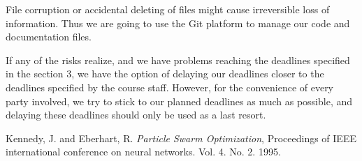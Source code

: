 \documentclass[twoside]{article}
\begin{document}
\begin{multicols}{2}
File corruption or accidental deleting of files might cause irreversible loss of information. Thus we are going to use the Git platform to manage our code and documentation files.

If any of the risks realize, and we have problems reaching the deadlines specified in the section 3, we have the option of delaying our deadlines closer to the deadlines specified by the course staff. However, for the convenience of every party involved, we try to stick to our planned deadlines as much as possible, and delaying these deadlines should only be used as a last resort.

\begin{thebibliography}{99} %

 Kennedy, J. and Eberhart, R.
  \emph{Particle Swarm Optimization},
 Proceedings of IEEE international conference on neural networks. Vol. 4. No. 2. 1995. 
 

 
 
\end{thebibliography}


\end{multicols}
\end{document}
